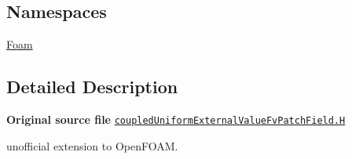 \subsection*{Namespaces}
\begin{DoxyCompactItemize}
\item 
 \hyperlink{namespaceFoam}{Foam}
\end{DoxyCompactItemize}


\subsection{Detailed Description}
{\bfseries Original source file} \href{../../../home/carlo/data/GeN-Foam/GeN-Foam_ffn/GeN-Foam/GeN-Foam/FMU4FOAM/ECI4FOAM/src/externalComm/externalIO/input/BC/coupledUniformExternalValue/coupledUniformExternalValueFvPatchField.H}{\tt coupled\+Uniform\+External\+Value\+Fv\+Patch\+Field.\+H}

\begin{DoxyVerb}unofficial extension to OpenFOAM.\end{DoxyVerb}
